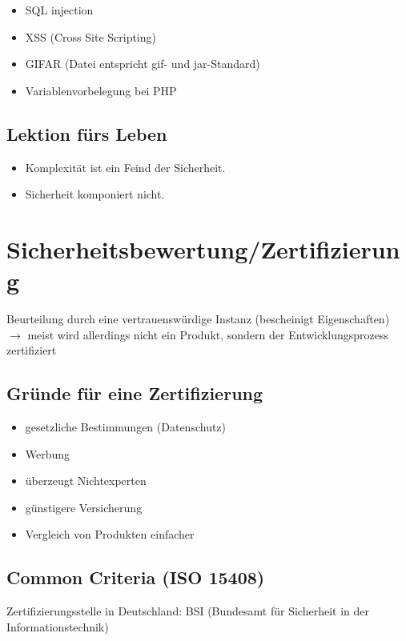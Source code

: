 \documentclass[a4paper,twoside,DIV15,BCOR12mm]{scrbook}
\begin{document}
\begin{itemize}
	\item SQL injection
	\item XSS (Cross Site Scripting)
	\item GIFAR (Datei entspricht gif- und jar-Standard)
	\item Variablenvorbelegung bei PHP
\end{itemize}

\section{Lektion fürs Leben}

\begin{itemize}
	\item Komplexität ist ein Feind der Sicherheit.
	\item Sicherheit komponiert nicht.
\end{itemize}


\chapter{Sicherheitsbewertung/Zertifizierung}

Beurteilung durch eine vertrauenswürdige Instanz (bescheinigt Eigenschaften) $\rightarrow$ meist wird allerdings nicht ein Produkt, sondern der Entwicklungsprozess zertifiziert

\section{Gründe für eine Zertifizierung}

\begin{itemize}
	\item gesetzliche Bestimmungen (Datenschutz)
	\item Werbung
	\item überzeugt Nichtexperten
	\item günstigere Versicherung
	\item Vergleich von Produkten \glqq einfacher\grqq
\end{itemize}

\section{Common Criteria (ISO 15408)}

Zertifizierungsstelle in Deutschland: BSI (Bundesamt für Sicherheit in der Informationstechnik)
\end{document}
